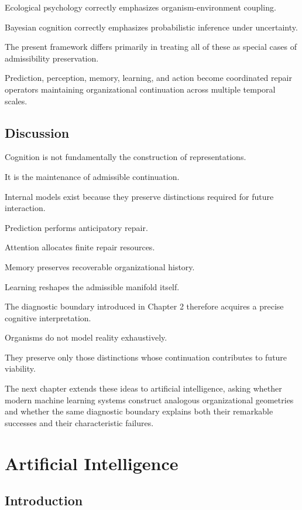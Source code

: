 \documentclass[11pt,oneside]{book}
\numberwithin{equation}{chapter}
\theoremstyle{definition}
\theoremstyle{plain}
\begin{document}
Ecological psychology correctly emphasizes organism-environment coupling.

Bayesian cognition correctly emphasizes probabilistic inference under
uncertainty.

The present framework differs primarily in treating all of these as special
cases of admissibility preservation.

Prediction, perception, memory, learning, and action become coordinated
repair operators maintaining organizational continuation across multiple
temporal scales.

\section{Discussion}

Cognition is not fundamentally the construction of representations.

It is the maintenance of admissible continuation.

Internal models exist because they preserve distinctions required for future
interaction.

Prediction performs anticipatory repair.

Attention allocates finite repair resources.

Memory preserves recoverable organizational history.

Learning reshapes the admissible manifold itself.

The diagnostic boundary introduced in Chapter 2 therefore acquires a precise
cognitive interpretation.

Organisms do not model reality exhaustively.

They preserve only those distinctions whose continuation contributes to
future viability.

The next chapter extends these ideas to artificial intelligence, asking
whether modern machine learning systems construct analogous organizational
geometries and whether the same diagnostic boundary explains both their
remarkable successes and their characteristic failures.

\chapter{Artificial Intelligence}

\section{Introduction}
\end{document}
